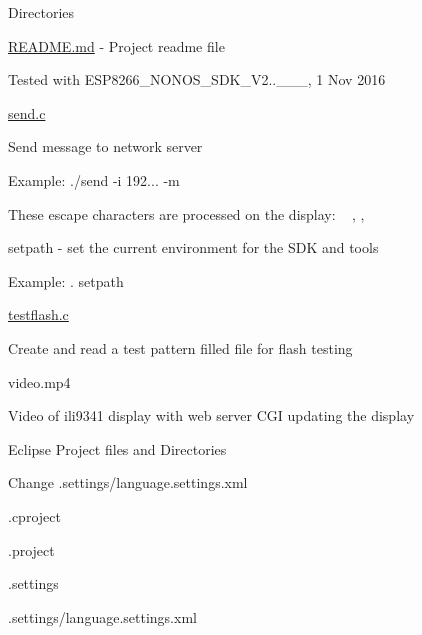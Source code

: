 \begin{DoxyParagraph}{Directories}
\begin{DoxyItemize}
\begin{DoxyItemize}
\item \hyperlink{README_8md}{R\+E\+A\+D\+M\+E.\+md} -\/ Project readme file
\begin{DoxyItemize}
\item Tested with E\+S\+P8266\+\_\+\+N\+O\+N\+O\+S\+\_\+\+S\+D\+K\+\_\+\+V2..\+\_\+\_\+\_, 1 Nov 2016
\end{DoxyItemize}
\item \hyperlink{send_8c}{send.\+c}
\begin{DoxyItemize}
\item Send message to network server
\item Example\+: ./send -\/i 192... -\/m \textquotesingle{}\textquotesingle{}
\begin{DoxyItemize}
\item These escape characters are processed on the display\+: ~\newline
, , 
\end{DoxyItemize}
\end{DoxyItemize}
\item setpath -\/ set the current environment for the S\+DK and tools
\begin{DoxyItemize}
\item Example\+: . setpath
\end{DoxyItemize}
\item \hyperlink{testflash_8c}{testflash.\+c}
\begin{DoxyItemize}
\item Create and read a test pattern filled file for flash testing
\end{DoxyItemize}
\item video.\+mp4
\begin{DoxyItemize}
\item Video of ili9341 display with web server C\+GI updating the display
\end{DoxyItemize}
\end{DoxyItemize}
\item Eclipse Project files and Directories
\begin{DoxyItemize}
\item Change .settings/language.\+settings.\+xml
\item .cproject
\item .project
\item .settings
\begin{DoxyItemize}
\item .settings/language.\+settings.\+xml
\begin{DoxyItemize}

\end{DoxyItemize}
\end{DoxyItemize}
\end{DoxyItemize}
\end{DoxyItemize}
\end{DoxyParagraph}
